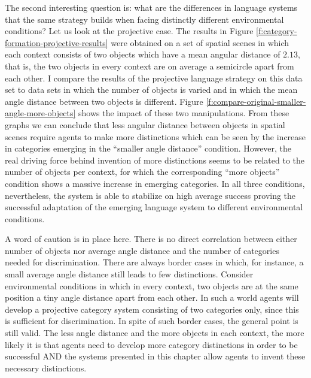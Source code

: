 The second interesting question is: what are the differences in language systems that
the same strategy builds when facing distinctly different environmental conditions? 
Let us look at the projective case. The results in Figure \ref{f:category-formation-projective-results}
were obtained on a set of spatial scenes in which each context consists of two objects
which have a mean angular distance of $2.13$, that is, the two objects in every context
are on average a semicircle apart from each other. I compare the results of
the projective language strategy on this data set to data sets in which the number of 
objects is varied and in which the mean angle distance between two objects is different. 
Figure \ref{f:compare-original-smaller-angle-more-objects}
shows the impact of these two manipulations. From these graphs we can
conclude that less angular distance between objects in spatial scenes require agents 
to make more distinctions which can be seen by the increase in categories 
emerging in the ``smaller angle distance'' condition. However, the real driving force 
behind invention of more distinctions seems to be related to the number of objects per context,
for which the corresponding ``more objects'' condition shows a massive increase in emerging
categories. In all three conditions, nevertheless, the system is able to stabilize on 
high average success proving the successful adaptation of the emerging language
system to different environmental conditions. 

A word of caution is in place here. There is no direct correlation between either number of 
objects nor average angle distance and the number of categories needed for discrimination. 
There are always border cases in which, for instance, a small average angle distance still leads to 
few distinctions. Consider environmental conditions in which in every context, two objects are 
at the same position a tiny angle distance
apart from each other. In such a world agents will develop a projective category system
consisting of two categories only, since this is sufficient for discrimination.
In spite of such border cases, the general point is still valid. The less angle distance
and the more objects in each context, the more likely it is that agents need to develop
more category distinctions in order to be successful AND the systems presented in this
chapter allow agents to invent these necessary distinctions.

